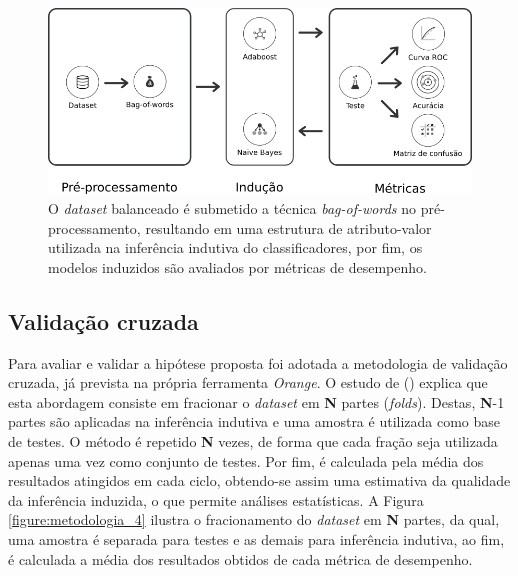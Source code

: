 \begin{figure}[H]
\begin{center}
    \includegraphics[scale=0.70]{images/metodologia_3.png}
\end{center}
\caption{O \textit{dataset} balanceado é submetido a técnica 
\textit{bag-of-words} no pré-processamento, resultando em uma estrutura de 
atributo-valor utilizada na inferência indutiva do classificadores, por fim, os 
modelos induzidos são avaliados por métricas de desempenho.}
\label{figure:metodologia_3}
\end{figure}

\subsection{Validação cruzada}
\label{subsection:validacao_cruzada}

Para avaliar e validar a hipótese proposta foi adotada a metodologia de 
validação cruzada, já prevista na própria ferramenta \textit{Orange}. O estudo 
de  (\citeyear{tavares2007estudo}) explica 
que esta abordagem consiste em fracionar o \textit{dataset} em \textbf{N} 
partes (\textit{folds}). Destas, \textbf{N}-1 partes são aplicadas na inferência 
indutiva e uma amostra é utilizada como base de testes. O método é repetido 
\textbf{N} vezes, de forma que cada fração seja utilizada apenas uma vez como
conjunto de testes. Por fim, é calculada pela média dos resultados atingidos em 
cada ciclo, obtendo-se assim uma estimativa da qualidade da inferência 
induzida, o que permite análises estatísticas. A Figura 
\ref{figure:metodologia_4} ilustra o fracionamento do \textit{dataset} em 
\textbf{N} partes, da qual, uma amostra é separada para testes e as demais para 
inferência indutiva, ao fim, é calculada a média dos resultados obtidos de 
cada métrica de desempenho. 

